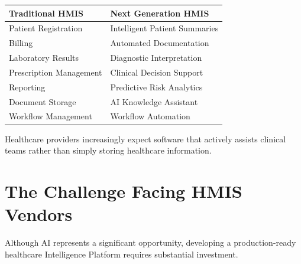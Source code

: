 \begin{center}

\begin{tabularx}{\textwidth}{|Y|Y|}
\hline


\textbf{Traditional HMIS} &
\textbf{Next Generation HMIS} \\

\hline

Patient Registration &
Intelligent Patient Summaries \\

Billing &
Automated Documentation \\

Laboratory Results &
Diagnostic Interpretation \\

Prescription Management &
Clinical Decision Support \\

Reporting &
Predictive Risk Analytics \\

Document Storage &
AI Knowledge Assistant \\

Workflow Management &
Workflow Automation \\

\hline

\end{tabularx}

\end{center}

\vspace{5mm}

Healthcare providers increasingly expect software that actively assists clinical teams rather than simply storing healthcare information.


\section{The Challenge Facing HMIS Vendors}

Although AI represents a significant opportunity, developing a production-ready healthcare Intelligence Platform requires substantial investment.

\vspace{4mm}

